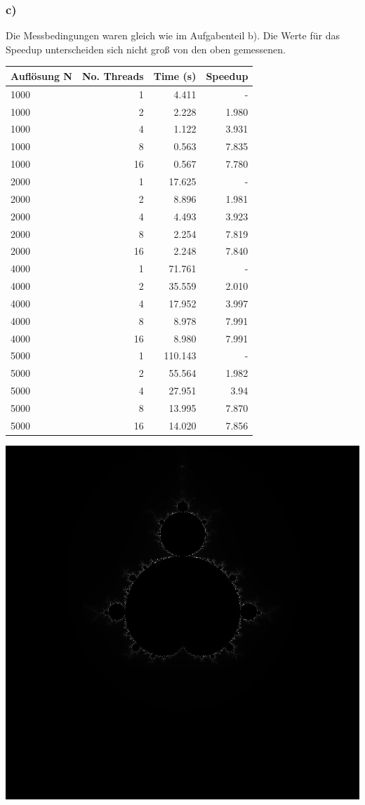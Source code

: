 \documentclass{article}
\begin{document}
	\newpage
        \subsubsection{c)}
        
        Die Messbedingungen waren gleich wie im Aufgabenteil b). Die Werte für das Speedup unterscheiden sich nicht groß von den oben gemessenen.\\
        
        \begin{tabular}{|l|r|r|r|}
        	\hline
        	 Auflösung N & No. Threads &  Time (s) & Speedup \\
        	 	\hline
        	 1000& 1 &  4.411 & - \\
        	 1000& 2 &  2.228 & 1.980 \\
        	 1000& 4 &  1.122 & 3.931 \\
        	 1000& 8 &  0.563 & 7.835\\
        	 1000& 16 &  0.567 & 7.780 \\
        	\hline
        	2000& 1 & 17.625 & - \\
        	2000& 2 &  8.896& 1.981 \\
        	2000& 4 &  4.493& 3.923 \\
        	2000& 8 &  2.254& 7.819 \\
        	2000& 16 &  2.248& 7.840 \\
        	\hline
        	4000& 1 & 71.761 & - \\
        	4000& 2 &  35.559 & 2.010 \\
        	4000& 4 &  17.952& 3.997 \\
        	4000& 8 &  8.978 & 7.991\\
        	4000& 16 &  8.980 & 7.991 \\
        	\hline
        	5000& 1 &  110.143 & - \\
        	5000& 2 &  55.564 & 1.982 \\
        	5000& 4 &  27.951 & 3.94 \\
        	5000& 8 &  13.995 & 7.870 \\
        	5000& 16 &  14.020 & 7.856\\
        	\hline
        \end{tabular}
	\begin{center}
		\includegraphics[width=0.6\linewidth]{Aufgaben-Ressourcen/normal-1000.jpg}	
	\end{center}
\end{document}
